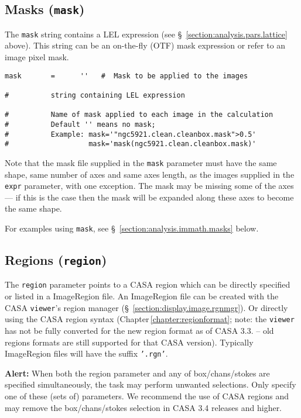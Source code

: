 \subsection{Masks ({\tt mask})}
\label{section:analysis.pars.mask}

The {\tt mask} string contains a LEL expression 
(see \S~\ref{section:analysis.pars.lattice} above).  This string
can be an on-the-fly (OTF) mask expression or refer to an 
image pixel mask.
\small
\begin{verbatim}
mask       =      ''   #  Mask to be applied to the images

#          string containing LEL expression

#          Name of mask applied to each image in the calculation
#          Default '' means no mask;  
#          Example: mask='"ngc5921.clean.cleanbox.mask">0.5'
#                   mask='mask(ngc5921.clean.cleanbox.mask)'
\end{verbatim}
\normalsize

Note that the mask file supplied in the {\tt mask} parameter must have
the same shape, same number of axes and same axes length, as the
images supplied in the {\tt expr} parameter, with one exception. The mask
may be missing some of the axes --- if this is the case then the mask
will be expanded along these axes to become the same shape.

For examples using {\tt mask}, see \S~\ref{section:analysis.immath.masks} 
below.


\subsection{Regions ({\tt region})}
\label{section:analysis.pars.regions}

The {\tt region} parameter points to a CASA region which can be
directly specified or listed in a ImageRegion file.  An
ImageRegion file can be created with the CASA {\tt viewer}'s region
manager (\S~\ref{section:display.image.rgnmgr}). Or directly using the
CASA region syntax (Chapter\,\ref{chapter:regionformat}; note: the
{\tt viewer} has not be fully converted for the new region format as
of CASA 3.3. -- old regions formats
  are still supported for that CASA version). 
Typically ImageRegion files will have the suffix {\tt '.rgn'}.  

{\bf Alert:} When both the region parameter and any of
box/chans/stokes are specified simultaneously, the task may perform
unwanted selections. Only specify one of these (sets of)
parameters. We recommend the use of CASA regions and may remove the
box/chans/stokes selection in CASA 3.4 releases and higher. 


